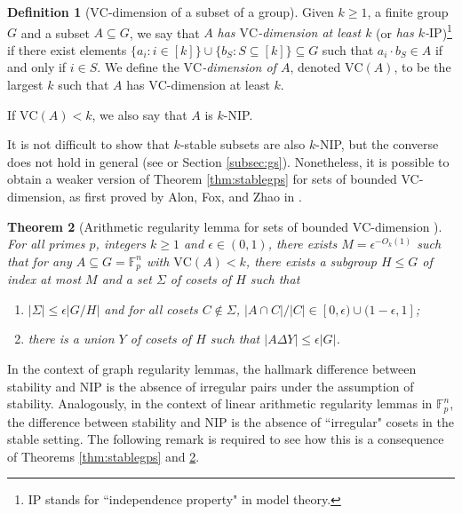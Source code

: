 \documentclass[12pt,oneside,british,a4wide]{amsart}
\newtheorem{theorem}{Theorem}[section]
\numberwithin{equation}{section}
\theoremstyle{definition}
\newtheorem{definition}[theorem]{Definition}
\def\F{\mathbb{F}}
\def\IP{\mathrm{IP}}
\def\VC{\mathrm{VC}}
\def\e{\epsilon}
\begin{document}
\begin{definition}[$\VC$-dimension of a subset of a group]\label{def:vcdim}
Given $k\geq 1$, a finite group $G$ and a subset $A\subseteq G$, we say that $A$ \emph{has $\VC$-dimension at least $k$} (or \emph{has $k$-$\IP$})\footnote{IP stands for ``independence property" in model theory.}  if there exist elements $\{a_i: i\in [k]\}\cup \{b_S:S\subseteq [k]\}\subseteq G$ such that $a_i\cdot b_S\in A$ if and only if $i\in S$.  We define the \emph{$\VC$-dimension of $A$}, denoted $\VC(A)$, to be the largest $k$ such that $A$ has $\VC$-dimension at least $k$.

If $\VC(A)<k$, we also say  that $A$ is $k$-NIP.
\end{definition}

It is not difficult to show that $k$-stable subsets are also $k$-NIP, but the converse does not hold in general (see \cite[Section 5]{Alon.2018is} or Section \ref{subsec:gs}). Nonetheless, it is possible to obtain a weaker version  of Theorem \ref{thm:stablegps} for sets of bounded VC-dimension, as first proved  by Alon, Fox, and Zhao in \cite{Alon.2018is}.    


\begin{theorem}[Arithmetic regularity lemma for sets of bounded $\VC$-dimension \cite{Alon.2018is}]\label{thm:vc}
For all primes $p$, integers $k\geq 1$ and $\e\in (0,1)$, there exists $M=\e^{-O_{k}(1)}$ such that for any $A\subseteq G= \F_p^n$ with $\VC(A)<k$, there exists a subgroup $H\leqslant G$ of index at most $M$ and a set $\Sigma$ of cosets of $H$ such that 
\begin{enumerate}[label=\normalfont(\roman*)] 
\item   $|\Sigma|\leq \e |G/H|$ and for all cosets $C\notin \Sigma$, $|A\cap C|/|C|\in [0,\e)\cup (1-\e,1]$; 
\item there is a union $Y$ of cosets of $H$ such that $|A\Delta Y|\leq \e|G|$.   
\end{enumerate}
\end{theorem}



In the context of graph regularity lemmas, the hallmark difference between stability and NIP is the absence of irregular pairs under the assumption of stability.  Analogously, in the context of linear arithmetic regularity lemmas in $\F_p^n$, the difference between stability and NIP is the absence of ``irregular" cosets in the stable setting.   The following remark is required to see how this is a consequence of Theorems \ref{thm:stablegps} and \ref{thm:vc}.
\end{document}
